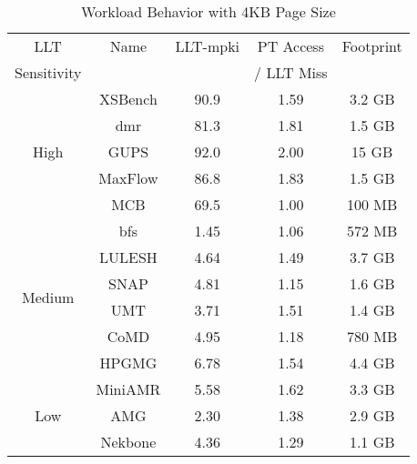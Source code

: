 \begin {table}[b]
\small
\begin{center} 
\vspace{-0.0 in}
\caption{Workload Behavior with 4KB Page Size}
\vspace{-0. in}
\begin{tabular}{| c | c | c | c | c | }
\hline
  LLT                   & Name     &  LLT-mpki  & PT Access    &  Footprint  \\ 
  Sensitivity           &          &            & / LLT Miss   &             \\ \hline
\multirow{5}{*}{High}   & XSBench  & 90.9       & 1.59         &  3.2 GB  \\
                        & dmr      & 81.3       & 1.81         &  1.5 GB  \\
                        & GUPS     & 92.0       & 2.00         &  15  GB  \\
                        & MaxFlow  & 86.8       & 1.83         &  1.5 GB  \\
                        & MCB      & 69.5       & 1.00         &  100 MB  \\ \hline
\multirow{6}{*}{Medium} & bfs      & 1.45       & 1.06         &  572 MB  \\
                        & LULESH   & 4.64       & 1.49         &  3.7  GB \\
                        & SNAP     & 4.81       & 1.15         &  1.6 GB  \\
                        & UMT      & 3.71       & 1.51         &  1.4 GB  \\
                        & CoMD     & 4.95       & 1.18         &  780 MB  \\
                        & HPGMG    & 6.78       & 1.54         &  4.4 GB  \\ \hline 
\multirow{3}{*}{Low}    & MiniAMR  & 5.58       & 1.62         &  3.3 GB  \\
                        & AMG      & 2.30       & 1.38         &  2.9 GB  \\ 
                        & Nekbone  & 4.36       & 1.29         &  1.1 GB  \\ \hline


\end{tabular}
\label{table:bench_char}
\vspace{-0.2in}
\end{center}
\normalsize
\end{table}
